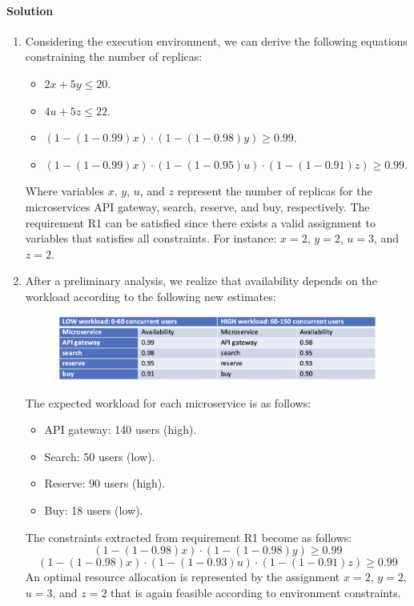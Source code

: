 \paragraph*{Solution}
\begin{enumerate}
    \item Considering the execution environment, we can derive the following equations constraining the number of replicas:
        \begin{itemize}
            \item $2x + 5y \leq 20$.
            \item $4u + 5z \leq 22$.
            \item $(1 - (1 - 0.99)x) \cdot (1 - (1 - 0.98)y) \geq 0.99$.
            \item $(1 - (1 - 0.99)x) \cdot (1 - (1 - 0.95)u) \cdot (1 - (1 - 0.91)z) \geq 0.99$. 
        \end{itemize}
        Where variables $x$, $y$, $u$, and $z$ represent the number of replicas for the microservices API gateway, search, reserve, and buy, respectively.
        The requirement R1 can be satisfied since there exists a valid assignment to variables that satisfies all constraints. 
        For instance: $x = 2$, $y = 2$, $u = 3$, and $z = 2$. 
    \item After a preliminary analysis, we realize that availability depends on the workload according to the following new estimates:
        \begin{figure}[H]
            \centering
            \includegraphics[width=0.9\linewidth]{images/load.png}
        \end{figure}
        The expected workload for each microservice is as follows:
        \begin{itemize}
            \item API gateway: 140 users (high). 
            \item Search: 50 users (low).
            \item Reserve: 90 users (high).
            \item Buy: 18 users (low).
        \end{itemize}
        The constraints extracted from requirement R1 become as follows:
        \[(1 - (1 - 0.98)x) \cdot (1 - (1 - 0.98)y) \geq 0.99\]
        \[(1 - (1 - 0.98)x) \cdot (1 - (1 - 0.93)u) \cdot (1 - (1 - 0.91)z) \geq 0.99\]
        An optimal resource allocation is represented by the assignment $x = 2$, $y = 2$, $u = 3$, and $z = 2$ that is again feasible according to environment constraints.
\end{enumerate}